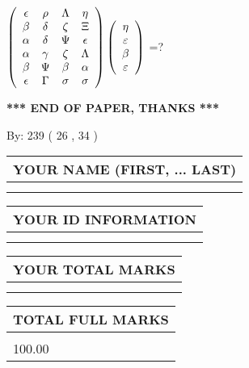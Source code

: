 \documentclass[12pt]{article}
\begin{document}
 
$  %
 \left( \begin{array}
 {
 c
 c
 c
 c
 }
 \epsilon & 
 \rho & 
 \Lambda & 
 \eta \\ 
 \beta & 
 \delta & 
                    \zeta & 
                    \Xi \\ 
 \alpha & 
 \delta & 
 \Psi & 
 \epsilon \\ 
 \alpha & 
 \gamma & 
                    \zeta & 
 \Lambda \\ 
 \beta & 
 \Psi & 
 \beta & 
 \alpha \\ 
 \epsilon & 
 \Gamma & 
 \sigma & 
 \sigma
 \end{array} \right)
 \left( \begin{array}
 {
 c
 }
 \eta \\ 
 \varepsilon \\ 
 \beta \\ 
 \varepsilon
 \end{array} \right)
$ =?
 

 

 
\vspace{0.3in}
   
   
 \vspace{0.2in}
 
   
   
   
   
\vspace{1.0in} 
{\textbf{\large{ *** END OF PAPER, THANKS *** }}} 
   
   
\hspace{1.0in} By: 
         239 (          26 ,           34 )
   
   
   
   
\newpage 
\setcounter{page}{ 
    32001 } 
   
   
   
   
\noindent\begin{tabular}{|l|}
\hline
YOUR NAME (FIRST, ... LAST)  \\
\hline
 \\ 
 \\ 
\hline
\end{tabular}
\hspace{0.05in} \begin{tabular}{|l|}
\hline
 YOUR   ID   INFORMATION  \\
\hline
 \\ 
 \\ 
\hline
\end{tabular}
   
   
\vspace{0.2in}\noindent\begin{tabular}{|l|}
\hline
YOUR TOTAL MARKS  \\
\hline
 \\ 
 \\ 
\hline
\end{tabular}
\hspace{0.05in} \begin{tabular}{|l|}
\hline
TOTAL FULL MARKS  \\
\hline
 \\ 
100.00 \\
\hline
\end{tabular}
   
\end{document}
